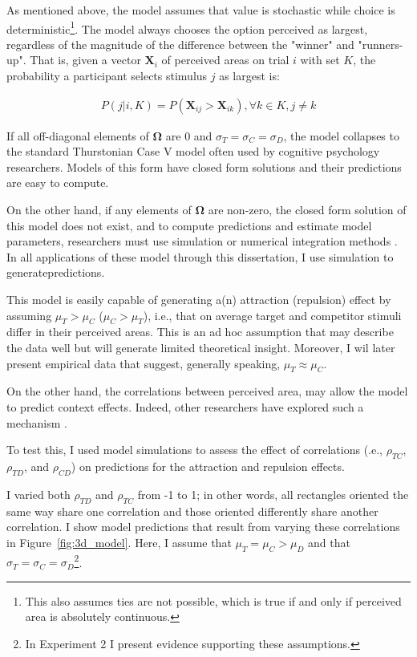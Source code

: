 As mentioned above, the model assumes that value is stochastic while choice is deterministic\footnote{This also assumes ties are not possible, which is true if and only if perceived area is absolutely continuous.}. The model always chooses the option perceived as largest, regardless of the magnitude of the difference between the "winner" and "runners-up". That is, given a vector $\mathbf{X}_i$ of perceived areas on trial $i$ with set $K$, the probability a participant selects stimulus $j$ as largest is:

\begin{align}
   P(j|i,K)=P(\mathbf{X}_{ij}>\mathbf{X}_{ik}), \forall k \in K, j \neq k
   \label{eqn:pchoice}
\end{align}

If all off-diagonal elements of $\boldsymbol{\Omega}$ are $0$ and $\sigma_{T}=\sigma_{C}=\sigma_{D}$, the model collapses to the standard Thurstonian Case V model \parencite{thurstone1927law} often used by cognitive psychology researchers. Models of this form have closed form solutions and their predictions are easy to compute.

On the other hand, if any elements of $\boldsymbol{\Omega}$ are non-zero, the closed form solution of this model does not exist, and to compute predictions and estimate model parameters, researchers must use simulation or numerical integration methods \parencite{train2009discrete}. In all applications of these model through this dissertation, I use simulation to generatepredictions. 

This model is easily capable of generating a(n) attraction (repulsion) effect by assuming $\mu_{T}>\mu_{C}$ ($\mu_{C}>\mu_{T}$), i.e., that on average target and competitor stimuli differ in their perceived areas. This is an ad hoc assumption that may describe the data well but will generate limited theoretical insight. Moreover, I wil later present empirical data that suggest, generally speaking, $\mu_{T}\approx\mu_{C}$. 

On the other hand, the correlations between perceived area, may allow the model to predict context effects. Indeed, other researchers have explored such a mechanism \parencite{kamakura1984predicting,haaijer1998utility}. 

To test this, I used model simulations to assess the effect of correlations (.e., $\rho_{TC}$, $\rho_{TD}$, and $\rho_{CD}$) on predictions for the attraction and repulsion effects. 

I varied both $\rho_{TD}$ and $\rho_{TC}$ from -1 to 1; in other words, all rectangles oriented the same way share one correlation and those oriented differently share another correlation. I show model predictions that result from varying these correlations in Figure~\ref{fig:3d_model}. Here, I assume that $\mu_{T}=\mu_{C}>\mu_{D}$ and that $\sigma_{T}=\sigma_{C}=\sigma_{D}$\footnote{In Experiment 2 I present evidence supporting these assumptions.}. 

